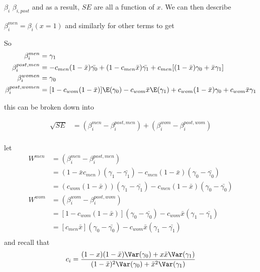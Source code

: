 $\beta_i$ $\beta_{i, post}$ and as a result, $SE$ are all a function of $x$. We can then describe

$\beta_{i}^{men} = \beta_i (x=1)$ and similarly for other terms to get

So 
\begin{align*}
	\beta_i^{men} &= \gamma_1 \\
	\beta_i^{post,men} &= -c_{men} ( 1- \bar{x}) \bar{\gamma_0} + (1 - c_{men}\bar{x}) \bar{\gamma_1} + c_{men} [ (1-\bar{x}) \gamma_0 + \bar{x}\gamma_1] \\
	\beta_i^{women} &= \gamma_0 \\
	\beta_i^{post,women} &= [ 1 - c_{wom}(1-\bar{x}) ]\E(\gamma_0) - c_{wom} \bar{x} \E(\gamma_1) + c_{wom} (1- \bar{x}) \gamma_0 + c_{wom} \bar{x} \gamma_1 \\
\end{align*} 

this can be broken down into

\begin{align*}
	\sqrt{ SE } &= (\beta_i^{men} - \beta_i^{post, men} )+ (\beta_i^{wom} - \beta_i^{post, wom}) \\
\end{align*} 

let 
 \begin{align*}
	 W^{men} &=  (\beta_i^{men} - \beta_i^{post, men}) \\
			&= (1 - \bar{x} c_{men}) (\gamma_1 - \bar{\gamma_1}) - c_{men} ( 1 - \bar{x}) (\gamma_0 - \bar{\gamma_0}) \\
			&= (c_{wom} (1 - \bar{x})) (\gamma_1 - \bar{\gamma_1}) - c_{men} ( 1 - \bar{x}) (\gamma_0 - \bar{\gamma_0}) \\
	 W^{wom} &=  (\beta_i^{wom} - \beta_i^{post, wom}) \\
			 &= [ 1 - c_{wom}(1 - \bar{x}) ] (\gamma_0 - \bar{\gamma_0}) - c_{wom} \bar{x} (\gamma_1 - \bar{\gamma_1}) \\
			 &= [ c_{men} \bar{x}] (\gamma_0 - \bar{\gamma_0}) - c_{wom} \bar{x} (\gamma_1 - \bar{\gamma_1}) \\
\end{align*} 
and recall that
\begin{align*}
	c_{i} &= \frac{(1-x)(1-\bar{x})\Var(\gamma_0) + x\bar{x}\Var(\gamma_1)}{(1-\bar{x})^2\Var(\gamma_0) + \bar{x}^2\Var(\gamma_1)} \\
\end{align*}

